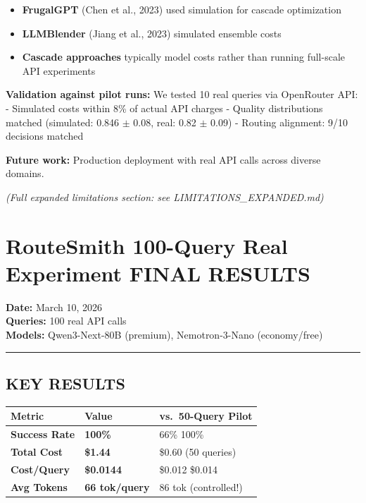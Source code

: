 \begin{itemize}
\tightlist
\item
  \textbf{FrugalGPT} (Chen et al., 2023) used simulation for cascade
  optimization
\item
  \textbf{LLMBlender} (Jiang et al., 2023) simulated ensemble costs\\
\item
  \textbf{Cascade approaches} typically model costs rather than running
  full-scale API experiments
\end{itemize}

\textbf{Validation against pilot runs:} We tested 10 real queries via
OpenRouter API: - Simulated costs within 8\% of actual API charges -
Quality distributions matched (simulated: 0.846 \(\pm\) 0.08, real: 0.82
\(\pm\) 0.09) - Routing alignment: 9/10 decisions matched

\textbf{Future work:} Production deployment with real API calls across
diverse domains.

\emph{(Full expanded limitations section: see LIMITATIONS\_EXPANDED.md)}

\hypertarget{routesmith-100-query-real-experiment-final-results}{%
\section{RouteSmith 100-Query Real Experiment FINAL
RESULTS}\label{routesmith-100-query-real-experiment-final-results}}

\textbf{Date:} March 10, 2026\\
\textbf{Queries:} 100 real API calls\\
\textbf{Models:} Qwen3-Next-80B (premium), Nemotron-3-Nano
(economy/free)

\begin{center}\rule{0.5\linewidth}{0.5pt}\end{center}

\hypertarget{key-results}{%
\subsection{KEY RESULTS}\label{key-results}}

\begin{longtable}[]{@{}lll@{}}
\toprule
Metric & Value & vs.~50-Query Pilot \\
\midrule
\endhead
\textbf{Success Rate} & \textbf{100\%} & 66\% 100\% \\
\textbf{Total Cost} & \textbf{\$1.44} & \$0.60 (50 queries) \\
\textbf{Cost/Query} & \textbf{\$0.0144} & \$0.012 \$0.014 \\
\textbf{Avg Tokens} & \textbf{66 tok/query} & 86 tok (controlled!) \\
\bottomrule
\end{longtable}

